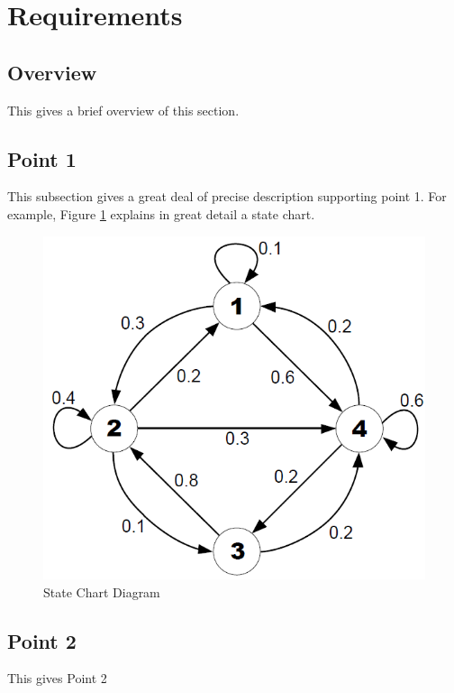 \section{Requirements}
\label{sec:Requirements}

\subsection{Overview} 
This gives a brief overview of this section.

\subsection{Point 1}
This subsection gives a great deal of precise description supporting point 1.  For example,
Figure \ref{State Chart 2} explains in great detail a state chart.

\begin{figure}[htb]
\centering
\includegraphics[width=.5\textwidth]{section02/assets/sample_image.png}
\caption[Short Caption 2]{\label{State Chart 2}State Chart Diagram}
\end{figure}

\subsection{Point 2}
This gives Point 2
